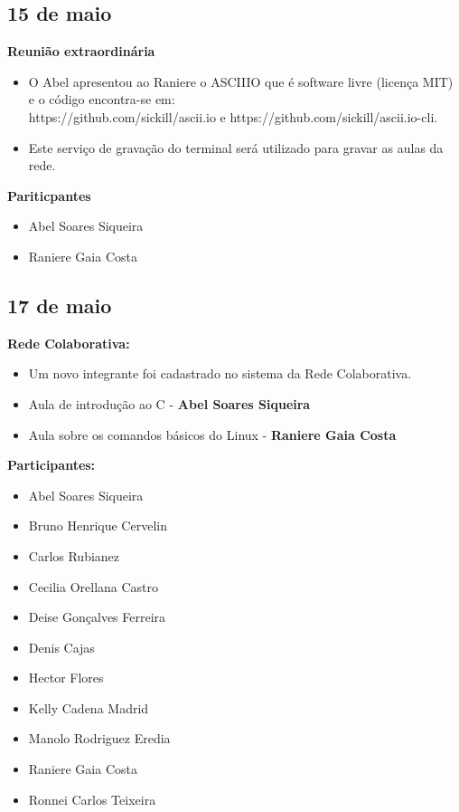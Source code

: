 \documentclass[12pt]{article}
\begin{document}
\subsection{15 de maio}

{\bf Reuni\~ao extraordin\'aria}

\begin{itemize}
\item O Abel apresentou ao Raniere o  ASCIIIO que \'e software livre (licença MIT) e o c\'odigo encontra-se em:\\
 https://github.com/sickill/ascii.io e https://github.com/sickill/ascii.io-cli.
\item Este servi\c{c}o de grava\c{c}\~ao do terminal ser\'a utilizado para gravar as aulas da rede.
\end{itemize}

{\bf Pariticpantes}

\begin{itemize}
\item Abel Soares Siqueira
\item Raniere Gaia Costa
\end{itemize}

\subsection{17 de maio}

{\bf Rede Colaborativa:} 

\begin{itemize}
\item Um novo integrante foi cadastrado no sistema da Rede Colaborativa.

\item Aula de introdu\c{c}\~ao ao C - {\bf Abel Soares Siqueira}
\item Aula sobre os comandos b\'asicos do Linux - {\bf Raniere Gaia Costa}
\end{itemize}

{\bf{Participantes:}}

\begin{itemize}
\item Abel Soares Siqueira
\item Bruno Henrique Cervelin
\item Carlos Rubianez
\item Cecilia Orellana Castro
\item Deise Gon\c{c}alves Ferreira
\item Denis Cajas
\item Hector Flores
\item Kelly Cadena Madrid
\item Manolo Rodriguez Eredia
\item Raniere Gaia Costa
\item Ronnei Carlos Teixeira
\end{itemize}
\end{document}
